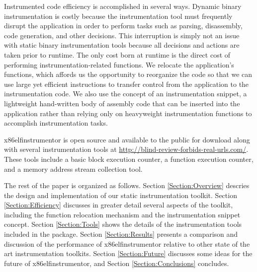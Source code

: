 Instrumented code efficiency is accomplished in several ways. Dynamic binary instrumentation
is costly because the instrumentation tool must frequently disrupt the application in order
to perform tasks such as parsing, disassembly, code generation, and other decisions. This
interruption is simply not an issue with static binary instrumentation tools because all
decisions and actions are taken prior to runtime. The only cost born at runtime is the direct
cost of performing instrumentation-related functions. We relocate the application's
functions, which affords us the opportunity to reorganize the code so that we
can use large yet efficient instructions to transfer control from the
application to the instrumentation code. We also use the concept of an
instrumentation snippet, a lightweight hand-written body of assembly code that can
be inserted into the application rather than relying only on heavyweight
instrumentation functions to accomplish instrumentation tasks.

x86elfinstrumentor is open source and available to the public for download along with several
instrumentation tools at \url{http://blind-review-forbids-real-urls.com/}. These tools include a basic block
execution counter, a function execution counter, and a memory address stream collection tool.

The rest of the paper is organized as follows. Section
\ref{Section:Overview} descries the design and implementation of our static
instrumentation toolkit. Section \ref{Section:Efficiency} discusses in greater detail
several aspects of the toolkit, including the function relocation mechanism and the
instrumentation snippet concept. Section \ref{Section:Tools} shows the details of
the instrumentation tools included in the package. Section \ref{Section:Results}
presents a comparison and discussion of the performance of x86elfinstrumentor relative
to other state of the art instrumentation toolkits. Section
\ref{Section:Future} discusses some ideas for the future of x86elfinstrumentor,
and Section \ref{Section:Conclusions} concludes.
